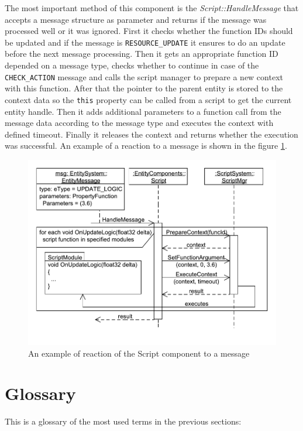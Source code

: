 \documentclass[a4paper, 12pt]{report}
\begin{document}
The most important method of this component is the \emph{Script::Handle\-Me\-ssa\-ge} that accepts a message structure as parameter and returns if the message was processed well or it was ignored. First it checks whether the function IDs should be updated and if the message is \verb/RESOURCE_UPDATE/ it ensures to do an update before the next message processing. Then it gets an appropriate function ID depended on a message type, checks whether to continue in case of the \verb/CHECK_ACTION/ message and calls the script manager to prepare a new context with this function. After that the pointer to the parent entity is stored to the context data so the \verb/this/ property can be called from a script to get the current entity handle. Then it adds additional parameters to a function call from the message data according to the message type and executes the context with defined timeout. Finally it releases the context and returns whether the execution was successful. An example of a reaction to a message is shown in the figure \ref{fig:scriptsystem-callback}.

\begin{figure}[htbp]
	\centering
		\includegraphics[width=1\textwidth]{ScriptCallbackSequence.pdf}
	\caption{An example of reaction of the Script component to a message}
	\label{fig:scriptsystem-callback}
\end{figure}

\section{Glossary}

This is a glossary of the most used terms in the previous sections:
\end{document}

